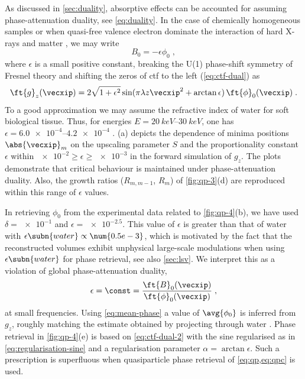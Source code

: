 \documentclass[
twoside,
openright,
titlepage,
numbers=noenddot,
headinclude,
fleqn,
a4paper,
footinclude=true,
cleardoublepage=empty,
abstractoff,
BCOR=5mm,
paper=a4,
fontsize=11pt,
british,ngerman,american,
]{scrreprt}
\begin{document}
As discussed in \cref{sec:duality}, absorptive effects can be
accounted for  assuming phase-attenuation duality, see
\cref{eq:duality}.  In the case of chemically homogeneous samples
\cite{Paganin2002jmicro} or when quasi-free valence electron dominate
the interaction of hard X-rays and matter \cite{Wu2005,Wu2009}, we may
write
\begin{equation}
  \label{eq:duality-2}
    B_0 = - \epsilon \phi_0 \;,
\end{equation}
where $\epsilon$ is a small positive constant, breaking the U(1)
phase-shift symmetry of Fresnel theory and shifting the zeros of
\ac{ctf} to the left (\cref{eq:ctf-dual}) as
\begin{equation}
   \label{eq:ctf-dual-2}
   \ft{g}_z(\vecxip) = 2 \sqrt{1+\epsilon^2}
   \sin(\pi\lambda z\vecxip^2+\arctan\epsilon) 
   \,\ft{\phi}_0(\vecxip) \;.   
\end{equation}
To a good approximation we may assume the refractive index of water
for soft biological tissue.  Thus, for energies
$E=\SIrange{20}{30}{keV}$, one has $\epsilon=
\numrange{6.0e-4}{4.2e-4}$ \cite{Henke1993}.  (a)
depicts the dependence of  minima positions $\abs{\vecxip}_m$ on the
upscaling parameter $S$ and the proportionality constant $\epsilon$
within $\num{e-2}\ge\epsilon\ge\num{e-3}$ in the forward simulation of
$g_z$.  The plots demonstrate that critical behaviour is maintained
under phase-attenuation duality.  Also, the growth ratios
($R_{m,m-1}$, $R_{m}$) of \cref{fig:qp-3}(d) are reproduced within
this range of $\epsilon$ values.

In retrieving $\phi_0$ from the experimental data related to
\cref{fig:qp-4}(b), we have used $\delta=\num{e-1}$ and
$\epsilon=\num{e-2.5}$.  This value of $\epsilon$ is greater than that
of water with $\epsilon\subn{water}\propto\num{0.5e-3}$, which is
motivated by the fact that the reconstructed volumes exhibit
unphysical large-scale modulations when using $\epsilon\subn{water}$
for phase retrieval, see also \cref{sec:lsv}.  We interpret this as a
violation of global phase-attenuation duality,
\begin{equation}
  \label{eq:duality-condition}
  \epsilon = \const 
  = \frac{\ft{B}_0(\vecxip)}{\ft{\phi}_0(\vecxip)} \;,
\end{equation}
at small frequencies.  Using \cref{eq:mean-phase} a value of
$\avg{\phi_0}$ is inferred from $g_z$, roughly matching the estimate
obtained by projecting through water \cite{Henke1993}.  Phase
retrieval in \cref{fig:qp-4}(e) is based on \cref{eq:ctf-dual-2} with
the sine regularised as in \cref{eq:regularisation-sine} and a
regularisation parameter $\alpha=\arctan\epsilon$.  Such a
prescription is superfluous when quasiparticle phase retrieval
of \cref{eq:qp,eq:qpc} is used.
\end{document}
